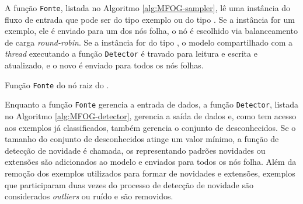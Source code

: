 A função \texttt{Fonte}, listada no Algoritmo \ref{alg:MFOG-sampler}, lê uma
instância do fluxo de entrada que pode ser do tipo exemplo ou do tipo \mcluster.
Se a instância for um exemplo, ele é enviado para um dos nós folha, o nó é
escolhido via balanceamento de carga \emph{round-robin}.
Se a instância for do tipo \mcluster, o modelo compartilhado com a \emph{thread}
executando a função \texttt{Detector} é travado para leitura e escrita e
atualizado, e o novo \mcluster é enviado para todos os nós folhas.

\begin{algorithm}[htb]
    
\caption{Função \texttt{Fonte} do nó raiz do \mfog.}
\label{alg:MFOG-sampler}
\end{algorithm}

Enquanto a função \texttt{Fonte} gerencia a entrada de dados, a função
\texttt{Detector}, listada no Algoritmo \ref{alg:MFOG-detector}, gerencia a saída
de dados e, como tem acesso aos exemplos já classificados, também gerencia o
conjunto de desconhecidos.
Se o tamanho do conjunto de desconhecidos atinge um valor mínimo, a função de
detecção de novidade é chamada, os \mclusters representando padrões novidades ou
extensões são adicionados ao modelo e enviados para todos os nós folha.
Além da remoção dos exemplos utilizados para formar \mclusters de novidades e
extensões, exemplos que participaram duas vezes do processo de detecção de
novidade são considerados \emph{outliers} ou ruído e são removidos.

